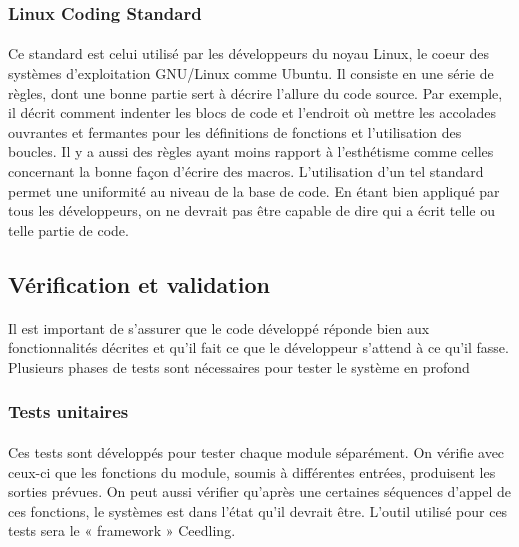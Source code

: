 		\subsubsection{Linux Coding Standard}
	
			\paragraph{}
			Ce standard est celui utilisé par les développeurs du noyau Linux, le coeur des systèmes d’exploitation GNU/Linux comme Ubuntu. Il consiste en une série de règles, dont une bonne partie sert à décrire l’allure du code source. Par exemple, il décrit comment indenter les blocs de code et l’endroit où mettre les accolades ouvrantes et fermantes pour les définitions de fonctions et l’utilisation des boucles. Il y a aussi des règles ayant moins rapport à l’esthétisme comme celles concernant la bonne façon d’écrire des macros. L’utilisation d’un tel standard permet une uniformité au niveau de la base de code. En étant bien appliqué par tous les développeurs, on ne devrait pas être capable de dire qui a écrit telle ou telle partie de code.
	
	\subsection{Vérification et validation}

		\paragraph{}
		Il est important de s’assurer que le code développé réponde bien aux fonctionnalités décrites et qu’il fait ce que le développeur s’attend à ce qu’il fasse. Plusieurs phases de tests sont nécessaires pour tester le système en profond
	
		\subsubsection{Tests unitaires}
	
			\paragraph{}
			Ces tests sont développés pour tester chaque module séparément. On vérifie avec ceux-ci que les fonctions du module, soumis à différentes entrées, produisent les sorties prévues. On peut aussi vérifier qu’après une certaines séquences d’appel de ces fonctions, le systèmes est dans l’état qu’il devrait être. L’outil utilisé pour ces tests sera le « framework » Ceedling.
		
